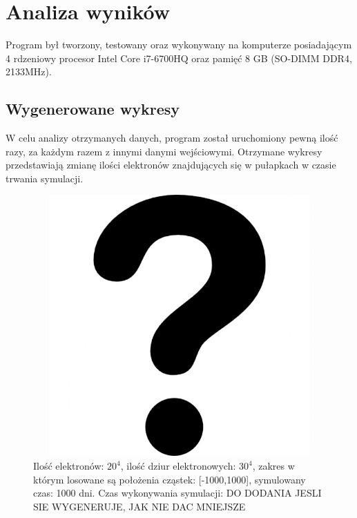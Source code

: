 \chapter{Analiza wyników}
Program był tworzony, testowany oraz wykonywany na komputerze posiadającym 4 rdzeniowy procesor Intel Core i7-6700HQ oraz pamięć 8 GB (SO-DIMM DDR4, 2133MHz).

\section{Wygenerowane wykresy}
\label{wynik:wykres}
W celu analizy otrzymanych danych, program został uruchomiony pewną ilość razy, za każdym razem z innymi danymi wejściowymi. Otrzymane wykresy przedstawiają zmianę ilości elektronów znajdujących się w pułapkach w czasie trwania symulacji.

\begin{figure}[H]
\centering
\includegraphics[width=17cm, height = 10cm]{q}
\caption{Ilość elektronów: $20^{4}$, ilość dziur elektronowych: $30^{4}$, zakres w którym losowane są położenia cząstek: [-1000,1000], symulowany czas: 1000 dni. Czas wykonywania symulacji: DO DODANIA JESLI SIE WYGENERUJE, JAK NIE DAC MNIEJSZE}
\end{figure}

